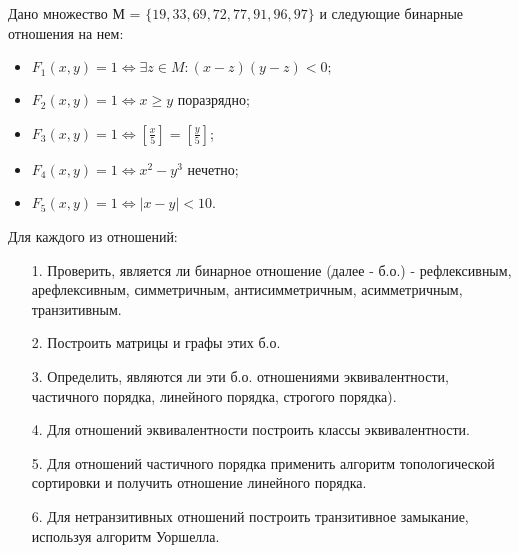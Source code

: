 
\renewcommand*{\proofname}{Решение}
\begin{problem}
	Дано множество М = $\{19, 33, 69, 72, 77, 91, 96, 97\}$
    и следующие бинарные отношения на нем:
    \begin{itemize}
    
    \item $F_1(x,y) = 1 \Leftrightarrow \exists z \in M : (x - z)(y - z) < 0;$

    \item $F_2(x, y) = 1 \Leftrightarrow x \geq y$ поразрядно;

    \item $F_3(x, y) = 1 \Leftrightarrow [\frac{x}{5}] = [\frac{y}{5}]$;

    \item $F_4(x,y) = 1 \Leftrightarrow x^2 - y^3$ нечетно;

    \item $F_5(x, y) = 1 \Leftrightarrow |x-y| < 10$.
    \end{itemize}
    Для каждого из отношений:

    \begin{enumerate}

    \item[1.] Проверить, является ли бинарное отношение (далее -  б.о.) - рефлексивным, арефлексивным, симметричным, антисимметричным, асимметричным, транзитивным.
    \item[2.] Построить матрицы и графы этих б.о.

    \item[3.] Определить, являются ли эти б.о. отношениями эквивалентности, частичного порядка, линейного порядка, строгого порядка).

    \item[4.] Для отношений эквивалентности построить классы эквивалентности.

    \item[5.] Для отношений частичного порядка применить алгоритм топологической сортировки и получить отношение линейного порядка.

    \item[6.] Для нетранзитивных отношений построить транзитивное замыкание, используя алгоритм Уоршелла.
    \end{enumerate}
\end{problem}

